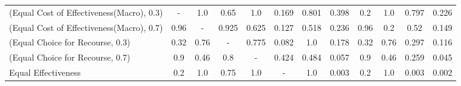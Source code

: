 \documentclass{article}
\begin{document}
\begin{table}[ht]
{\begin{tabular}{lccccccccccc}
\midrule
(Equal Cost of Effectiveness(Macro), 0.3)  &                                         - &                                       1.0 &                             0.65 &                              1.0 &               0.169 &                                    0.801 &                                     0.398 &                                       0.2 &                                       1.0 &                            0.797 &                                      0.226 \\
(Equal Cost of Effectiveness(Macro), 0.7)  &                                      0.96 &                                         - &                            0.925 &                            0.625 &               0.127 &                                    0.518 &                                     0.236 &                                      0.96 &                                       0.2 &                             0.52 &                                      0.149 \\
(Equal Choice for Recourse, 0.3)           &                                      0.32 &                                      0.76 &                                - &                            0.775 &               0.082 &                                      1.0 &                                     0.178 &                                      0.32 &                                      0.76 &                            0.297 &                                      0.116 \\
(Equal Choice for Recourse, 0.7)           &                                       0.9 &                                      0.46 &                              0.8 &                                - &               0.424 &                                    0.484 &                                     0.057 &                                       0.9 &                                      0.46 &                            0.259 &                                      0.045 \\
Equal Effectiveness                        &                                       0.2 &                                       1.0 &                             0.75 &                              1.0 &                   - &                                      1.0 &                                     0.003 &                                       0.2 &                                       1.0 &                            0.003 &                                      0.002 \\

\end{tabular}}
\end{table}
\end{document}
